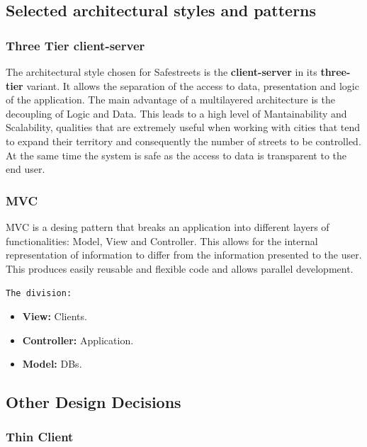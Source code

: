 \subsection{Selected architectural styles and patterns}

\subsubsection{Three Tier client-server}

The architectural style chosen for Safestreets is the 
\textbf{client-server} in its \textbf{three-tier} variant.  
It allows the separation of the access to data, 
presentation and logic of the application.
The main advantage of a multilayered architecture 
is the decoupling of Logic and Data. This leads to a high 
level of Mantainability and Scalability, 
qualities that are extremely useful when working with 
cities that tend to expand their territory and consequently 
the number of streets to be controlled.
At the same time the system is safe as the access to data 
is transparent to the end user.

\subsubsection{MVC}

MVC is a desing pattern that breaks an application into 
different layers of functionalities: Model, View and 
Controller.
This allows for the internal representation of 
information to differ from the information presented 
to the user. 
This produces easily reusable and flexible code 
and allows parallel development. 

\texttt{The division:}

\begin{itemize}
    \item \textbf{View:} Clients.
    \item \textbf{Controller:} Application.
    \item \textbf{Model:} DBs.
    
    
\end{itemize}

\subsection{Other Design Decisions}

\subsubsection{Thin Client}

